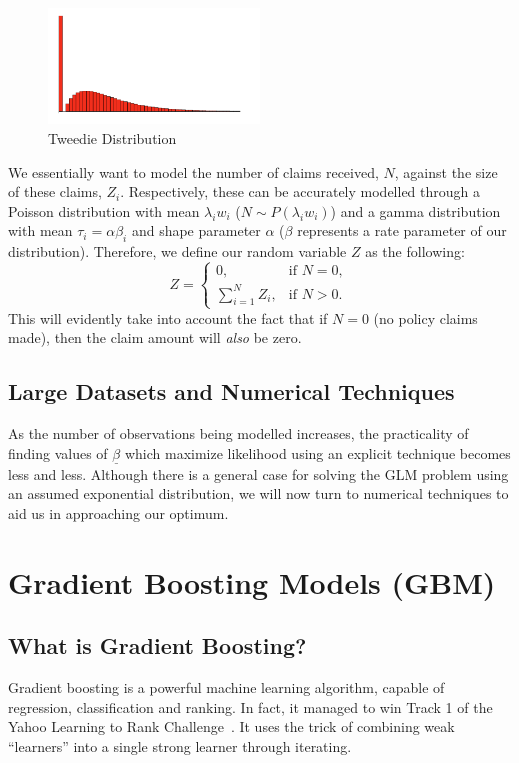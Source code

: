 \documentclass{article}
\begin{document}
\begin{figure}[H]
\centering
\includegraphics[width=0.5\textwidth]{images/Tweedie.png}
\caption{Tweedie Distribution} \label{fig:Tweedie_dis}
\end{figure}

We essentially want to model the number of claims received, $N$, against the size of these claims, $Z_i$. Respectively, these can be accurately modelled through a Poisson distribution with mean $\lambda_i w_i$ ($N\sim P(\lambda_i w_i)$) and a gamma distribution with mean $\tau_i = \alpha\beta_i$ and shape parameter $\alpha$ ($\beta$ represents a rate parameter of our distribution). Therefore, we define our random variable $Z$ as the following:
\begin{equation}
    Z = \left\{ \begin{matrix} 0, & \text{if }N = 0, \\ \sum_{i=1}^N Z_i, & \text{if }N>0. \end{matrix}\right.
\end{equation}
This will evidently take into account the fact that if $N=0$ (no policy claims made), then the claim amount will \textit{also} be zero.

\subsection{Large Datasets and Numerical Techniques}
As the number of observations being modelled increases, the practicality of finding values of $\underline{\beta}$ which maximize likelihood using an explicit technique becomes less and less. Although there is a general case for solving the GLM problem using an assumed exponential distribution, we will now turn to numerical techniques to aid us in approaching our optimum.

\section{Gradient Boosting Models (GBM)}
\subsection{What is Gradient Boosting?}
Gradient boosting is a powerful machine learning algorithm, capable of regression, classification and ranking. In fact, it managed to win Track 1 of the Yahoo Learning to Rank Challenge~\cite{GBM}. It uses the trick of combining weak ``learners'' into a single strong learner through iterating.
\end{document}
